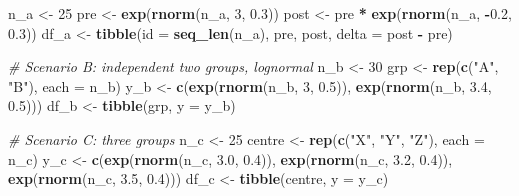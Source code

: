 \documentclass[
]{article}
\newenvironment{Shaded}{\begin{snugshade}}{\end{snugshade}}
\newcommand{\AttributeTok}[1]{\textcolor[rgb]{0.13,0.29,0.53}{#1}}
\newcommand{\CommentTok}[1]{\textcolor[rgb]{0.56,0.35,0.01}{\textit{#1}}}
\newcommand{\DecValTok}[1]{\textcolor[rgb]{0.00,0.00,0.81}{#1}}
\newcommand{\FloatTok}[1]{\textcolor[rgb]{0.00,0.00,0.81}{#1}}
\newcommand{\FunctionTok}[1]{\textcolor[rgb]{0.13,0.29,0.53}{\textbf{#1}}}
\newcommand{\NormalTok}[1]{#1}
\newcommand{\OtherTok}[1]{\textcolor[rgb]{0.56,0.35,0.01}{#1}}
\newcommand{\SpecialCharTok}[1]{\textcolor[rgb]{0.81,0.36,0.00}{\textbf{#1}}}
\newcommand{\StringTok}[1]{\textcolor[rgb]{0.31,0.60,0.02}{#1}}
\begin{document}
\begin{Shaded}
\begin{Highlighting}[]
\NormalTok{n\_a }\OtherTok{\textless{}{-}} \DecValTok{25}
\NormalTok{pre }\OtherTok{\textless{}{-}} \FunctionTok{exp}\NormalTok{(}\FunctionTok{rnorm}\NormalTok{(n\_a, }\DecValTok{3}\NormalTok{, }\FloatTok{0.3}\NormalTok{))}
\NormalTok{post }\OtherTok{\textless{}{-}}\NormalTok{ pre }\SpecialCharTok{*} \FunctionTok{exp}\NormalTok{(}\FunctionTok{rnorm}\NormalTok{(n\_a, }\SpecialCharTok{{-}}\FloatTok{0.2}\NormalTok{, }\FloatTok{0.3}\NormalTok{))}
\NormalTok{df\_a }\OtherTok{\textless{}{-}} \FunctionTok{tibble}\NormalTok{(}\AttributeTok{id =} \FunctionTok{seq\_len}\NormalTok{(n\_a), pre, post,}
               \AttributeTok{delta =}\NormalTok{ post }\SpecialCharTok{{-}}\NormalTok{ pre)}

\CommentTok{\# Scenario B: independent two groups, lognormal}
\NormalTok{n\_b }\OtherTok{\textless{}{-}} \DecValTok{30}
\NormalTok{grp }\OtherTok{\textless{}{-}} \FunctionTok{rep}\NormalTok{(}\FunctionTok{c}\NormalTok{(}\StringTok{"A"}\NormalTok{, }\StringTok{"B"}\NormalTok{), }\AttributeTok{each =}\NormalTok{ n\_b)}
\NormalTok{y\_b }\OtherTok{\textless{}{-}} \FunctionTok{c}\NormalTok{(}\FunctionTok{exp}\NormalTok{(}\FunctionTok{rnorm}\NormalTok{(n\_b, }\DecValTok{3}\NormalTok{, }\FloatTok{0.5}\NormalTok{)),}
         \FunctionTok{exp}\NormalTok{(}\FunctionTok{rnorm}\NormalTok{(n\_b, }\FloatTok{3.4}\NormalTok{, }\FloatTok{0.5}\NormalTok{)))}
\NormalTok{df\_b }\OtherTok{\textless{}{-}} \FunctionTok{tibble}\NormalTok{(grp, }\AttributeTok{y =}\NormalTok{ y\_b)}

\CommentTok{\# Scenario C: three groups}
\NormalTok{n\_c }\OtherTok{\textless{}{-}} \DecValTok{25}
\NormalTok{centre }\OtherTok{\textless{}{-}} \FunctionTok{rep}\NormalTok{(}\FunctionTok{c}\NormalTok{(}\StringTok{"X"}\NormalTok{, }\StringTok{"Y"}\NormalTok{, }\StringTok{"Z"}\NormalTok{), }\AttributeTok{each =}\NormalTok{ n\_c)}
\NormalTok{y\_c }\OtherTok{\textless{}{-}} \FunctionTok{c}\NormalTok{(}\FunctionTok{exp}\NormalTok{(}\FunctionTok{rnorm}\NormalTok{(n\_c, }\FloatTok{3.0}\NormalTok{, }\FloatTok{0.4}\NormalTok{)),}
         \FunctionTok{exp}\NormalTok{(}\FunctionTok{rnorm}\NormalTok{(n\_c, }\FloatTok{3.2}\NormalTok{, }\FloatTok{0.4}\NormalTok{)),}
         \FunctionTok{exp}\NormalTok{(}\FunctionTok{rnorm}\NormalTok{(n\_c, }\FloatTok{3.5}\NormalTok{, }\FloatTok{0.4}\NormalTok{)))}
\NormalTok{df\_c }\OtherTok{\textless{}{-}} \FunctionTok{tibble}\NormalTok{(centre, }\AttributeTok{y =}\NormalTok{ y\_c)}
\end{Highlighting}
\end{Shaded}
\end{document}
